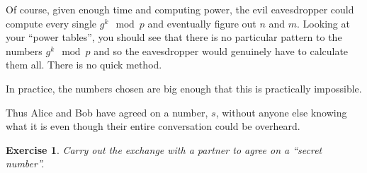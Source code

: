 \documentclass[
  html5,
  mathml,
  use filename
]{internet}
\newtheorem{exercise}{Exercise}
\begin{document}
Of course, given enough time and computing power, the evil eavesdropper could compute every single \(g^k \mod p\) and eventually figure out \(n\) and \(m\).
Looking at your ``power tables'', you should see that there is no particular pattern to the numbers \(g^k \mod p\) and so the eavesdropper would genuinely have to calculate them all.
There is no quick method.

In practice, the numbers chosen are big enough that this is practically impossible.

Thus Alice and Bob have agreed on a number, \(s\), without anyone else knowing what it is even though their entire conversation could be overheard.

\begin{exercise}
Carry out the exchange with a partner to agree on a ``secret number''.
\end{exercise}
\end{document}
